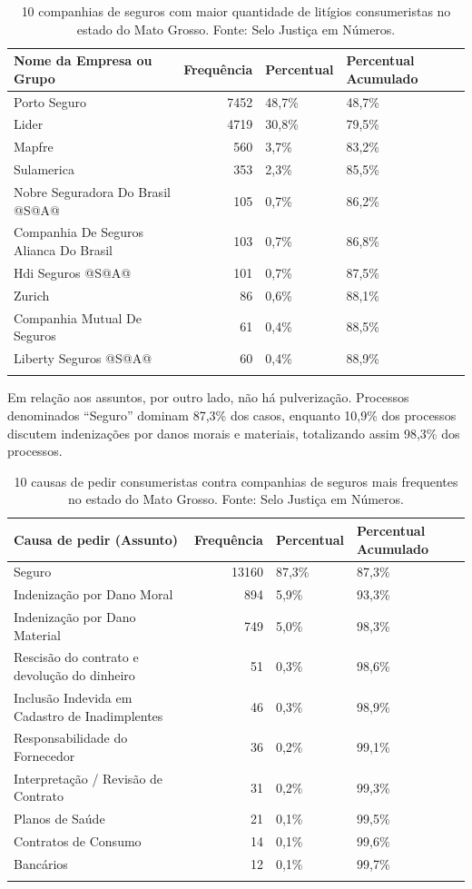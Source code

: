 \documentclass[]{report}
\begin{document}
\begin{longtable}{lrll}
\caption{10 companhias de seguros com maior quantidade de litígios consumeristas no estado do Mato Grosso. Fonte: Selo Justiça em Números.} \\
  \hline
Nome da Empresa ou Grupo & Frequência & Percentual & Percentual Acumulado \\
  \hline
Porto Seguro & 7452 & 48,7\% & 48,7\% \\
  Lider & 4719 & 30,8\% & 79,5\% \\
  Mapfre & 560 & 3,7\% & 83,2\% \\
  Sulamerica & 353 & 2,3\% & 85,5\% \\
  Nobre
Seguradora Do
Brasil @S@A@ & 105 & 0,7\% & 86,2\% \\
  Companhia De
Seguros Alianca
Do Brasil & 103 & 0,7\% & 86,8\% \\
  Hdi Seguros
@S@A@ & 101 & 0,7\% & 87,5\% \\
  Zurich &  86 & 0,6\% & 88,1\% \\
  Companhia
Mutual De
Seguros &  61 & 0,4\% & 88,5\% \\
  Liberty Seguros
@S@A@ &  60 & 0,4\% & 88,9\% \\
   \hline
\hline
\label{unnamed-chunk-50}
\end{longtable}

Em relação aos assuntos, por outro lado, não há pulverização. Processos
denominados ``Seguro'' dominam 87,3\% dos casos, enquanto 10,9\% dos
processos discutem indenizações por danos morais e materiais,
totalizando assim 98,3\% dos processos.

\begin{longtable}{lrll}
\caption{10 causas de pedir consumeristas contra companhias de seguros mais frequentes no estado do Mato Grosso. Fonte: Selo Justiça em Números.} \\
  \hline
Causa de pedir (Assunto) & Frequência & Percentual & Percentual Acumulado \\
  \hline
Seguro & 13160 & 87,3\% & 87,3\% \\
  Indenização por Dano Moral & 894 & 5,9\% & 93,3\% \\
  Indenização por Dano Material & 749 & 5,0\% & 98,3\% \\
  Rescisão do contrato e devolução do dinheiro &  51 & 0,3\% & 98,6\% \\
  Inclusão Indevida em Cadastro de Inadimplentes &  46 & 0,3\% & 98,9\% \\
  Responsabilidade do Fornecedor &  36 & 0,2\% & 99,1\% \\
  Interpretação / Revisão de Contrato &  31 & 0,2\% & 99,3\% \\
  Planos de Saúde &  21 & 0,1\% & 99,5\% \\
  Contratos de Consumo &  14 & 0,1\% & 99,6\% \\
  Bancários &  12 & 0,1\% & 99,7\% \\
   \hline
\hline
\label{unnamed-chunk-51}
\end{longtable}
\end{document}
